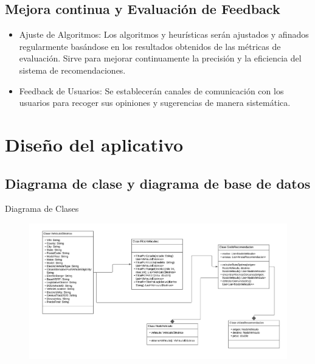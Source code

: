 \documentclass[12pt]{article}
\begin{document}
\subsection{Mejora continua y Evaluación de Feedback}
\begin{itemize}
    \item Ajuste de Algoritmos: Los algoritmos y heurísticas serán ajustados y afinados regularmente basándose en los resultados obtenidos de las métricas de evaluación. Sirve para mejorar continuamente la precisión y la eficiencia del sistema de recomendaciones.
    \item Feedback de Usuarios: Se establecerán canales de comunicación con los usuarios para recoger sus opiniones y sugerencias de manera sistemática.
\end{itemize}




\section{Diseño del aplicativo}
\subsection{Diagrama de clase y diagrama de base de datos}

Diagrama de Clases
\begin{figure}[htbp]
    \centering
    \includegraphics[width=\textwidth]{./imgs-latex/diagramadeclases.png}\label{fig:diagramadeclases}
\end{figure}
\end{document}
